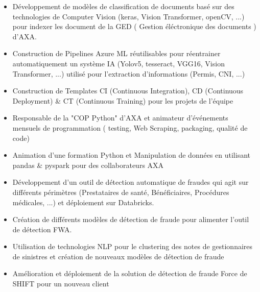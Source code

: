 \documentclass[10pt,letter,ragged2e,withhyper]{altacv}
\renewcommand{\divider}{\textcolor{body!30}{\hdashrule{\linewidth}{0.6pt}{0.5ex}}\medskip}
\begin{document}
\begin{paracol}{2}



\begin{itemize}
  \item Développement de modèles de classification de documents basé sur des technologies de Computer Vision (keras, Vision Transformer, openCV, ...) pour indexer les document de la GED ( Gestion éléctronique des documents ) d'AXA.
  \item Construction de Pipelines Azure ML réutilisables pour réentrainer automatiquement un système IA (Yolov5, tesseract, VGG16, Vision Transformer, ...) utilisé pour l'extraction d'informations (Permis, CNI, ...)
  \item Construction de Templates CI (Continuous Integration), CD (Continuous Deployment) \& CT (Continuous Training) pour les projets de l'équipe
  \item Responsable de la "COP Python" d'AXA et animateur d'événements mensuels de programmation ( testing, Web Scraping, packaging, qualité de code)
  \item Animation d'une formation Python et Manipulation de données en utilisant pandas \& pyspark pour des collaborateurs AXA
\end{itemize}

\divider
{}

\begin{itemize}
  \item Développement d'un outil de détection automatique de fraudes qui agit sur différents périmètres (Prestataires de santé, Bénéficiaires, Procédures médicales, ...) et déploiement sur Databricks.
  \item Création de différents modèles de détection de fraude pour alimenter l'outil de détection FWA.
\end{itemize}

\divider
{}

\begin{itemize}
  \item Utilisation de technologies NLP pour le clustering des notes de gestionnaires de sinistres et création de nouveaux modèles de détection de fraude
  \item Amélioration et déploiement de la solution de détection de fraude Force de SHIFT pour un nouveau client
\end{itemize}




\end{paracol}
\end{document}
